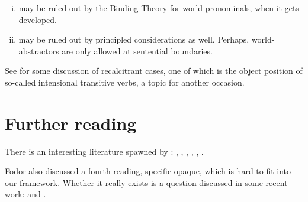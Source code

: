 \begin{enumerate}[(i)] 
\item may be ruled out by the Binding Theory for world pronominals, when it gets
  developed.
\item may be ruled out by principled considerations as well. Perhaps,
  world-abstractors are only allowed at sentential boundaries.
\end{enumerate}
%
See \cite{larson-2002-grammar-intensionality} for some discussion of
recalcitrant cases, one of which is the object position of so-called intensional
transitive verbs, a topic for another occasion.

\section{Further reading}

There is an interesting literature spawned by \cite{percus-2000-constraints}:
\cite{schwager-2009-qualities}, \cite{romoli-sudo-2009-dere},
\cite{keshet-2010-economy}, \cite{keshet-2011-split},
\cite{schwarz-2012-situation-pronouns},
\cite{keshet-schwarz-2014-de-re-de-dicto}.

Fodor also discussed a fourth reading, specific opaque, which is hard to fit
into our framework. Whether it really exists is a question discussed in some
recent work: \cite{szabo-2010-specific-opaque} and
\cite{francez-2017-summative}.



